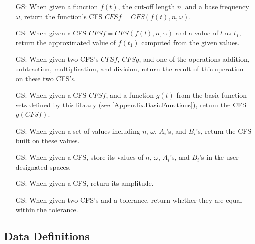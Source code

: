 \documentclass[12pt]{article}
\newcounter{goalnum} %
\begin{document}
\begin{itemize}
	
	\item[GS\refstepcounter{goalnum}\thegoalnum \label{GS:ConvertFromFunc}:] 
	When given a function $f(t)$, the cut-off length $n$, and a base frequency 
	$\omega$, return the function's CFS $\mathit{CFSf}=\mathit{CFS}(f(t), n, \omega)$.
	\item[GS\refstepcounter{goalnum}\thegoalnum \label{GS:FuncValue}:] 
	When given a CFS $\mathit{CFSf}=\mathit{CFS}(f(t), n, \omega)$ and a value of $t$ as $t_1$, 
	return the approximated value of $f(t_1)$ computed from the given values.
	\item[GS\refstepcounter{goalnum}\thegoalnum \label{GS:Operation}:] 
	When given two CFS's $\mathit{CFSf}$, $\mathit{CFSg}$, and one of the 
	operations addition, subtraction, multiplication, and division, return 
	the result of this operation on these two CFS's.
	\item[GS\refstepcounter{goalnum}\thegoalnum \label{GS:Function}:] 
	When given a CFS $\mathit{CFSf}$, and a function $g(t)$ from the basic 
	function sets defined by this library (see \autoref{Appendix:BasicFunctions}), return the CFS $g(CFSf)$. 
	 
	\item[GS\refstepcounter{goalnum}\thegoalnum \label{GS:ConvertFromOther}:] 
	When given a set of values including $n$, $\omega$, $A_i$'s, and $B_i$'s, 
	return the CFS built on these values.
	\item[GS\refstepcounter{goalnum}\thegoalnum \label{GS:ConvertToOther}:] 
	When given a CFS, store its values of $n$, $\omega$, $A_i$'s, and $B_i$'s 
	in the user-designated spaces.
	\item[GS\refstepcounter{goalnum}\thegoalnum \label{GS:Amp}:] When given 
	a CFS, return its amplitude.
	\item[GS\refstepcounter{goalnum}\thegoalnum \label{GS:ToleratedEquality}:] 
	When given two CFS's and a tolerance, return whether they are equal 
	within the tolerance.
\end{itemize}

\subsection{Data Definitions} \label{sec_datadef}
\end{document}
